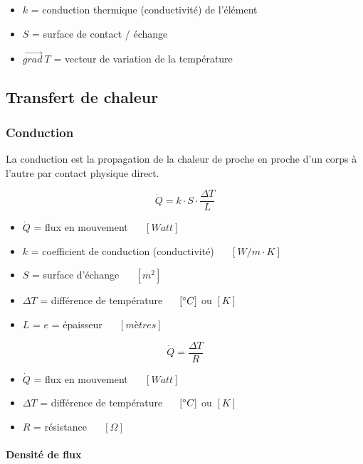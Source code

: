 \documentclass[]{article}
\let\oldparagraph\paragraph
\renewcommand{\paragraph}[1]{\oldparagraph{#1}\mbox{}}
\begin{document}
\begin{itemize}
	\item
		$k$ = conduction thermique (conductivité) de l’élément
	\item
		$S$ = surface de contact / échange
	\item	
		$\vec{grad}~ T$ = vecteur de variation de la température
\end{itemize}



\subsection{Transfert de chaleur}\label{transfert-chaleur}

\subsubsection{Conduction}\label{conduction}

La conduction est la propagation de la chaleur de proche en proche d’un corps à l’autre par contact physique direct.


$$ \dot{Q} = k \cdot S \cdot \dfrac{\Delta T}{L} $$

\begin{itemize}
	\item 
		$ \dot{Q} $ = flux en mouvement ~~  $[Watt]$
	\item
		$ k $ = coefficient de conduction (conductivité) ~~ $[W/m \cdot K]$
	\item
		$ S $ = surface d’échange ~~ $[m^2]$
	\item
		$ \Delta T $ = différence de température ~~ $[\degree C]$ ou $[K]$
	\item
		$ L $ = $e$ = épaisseur ~~ $[mètres]$
\end{itemize}



$$ \dot{Q} = \dfrac{\Delta T}{R} $$

\begin{itemize}
	\item
		$ \dot{Q} $ = flux en mouvement ~~ $[Watt]$
	\item
		$ \Delta T $ = différence de température ~~ $[\degree C]$ ou $[K]$
	\item 
		$ R $ = résistance ~~ $[\Omega]$
\end{itemize}


%
\paragraph{Densité de flux}
\end{document}
